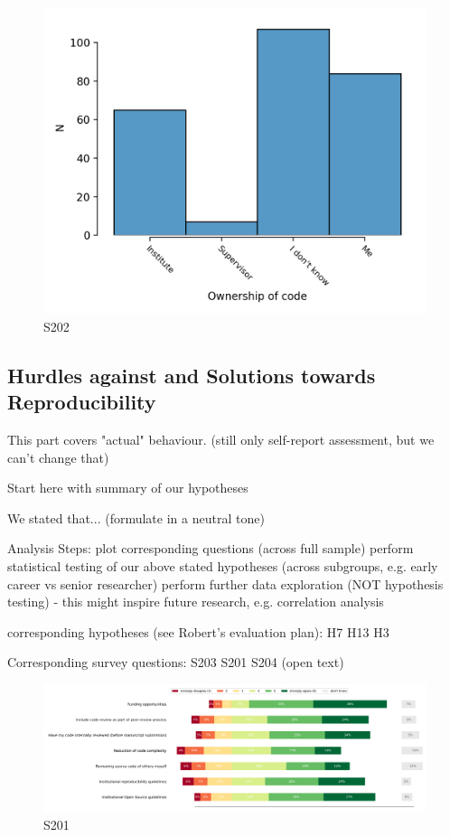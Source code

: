 \documentclass{article}
\begin{document}
\begin{figure}[h!]
    \centering
    \includegraphics[width=\textwidth]{../figs/S202.png}
	\caption{S202 }
    \label{fig:S202}
\end{figure}

\subsection{Hurdles against and Solutions towards Reproducibility}

This part covers "actual" behaviour. (still only self-report assessment, but we can't change that)

    Start here with summary of our hypotheses

We stated that... (formulate in a neutral tone)

    Analysis Steps:
        plot corresponding questions (across full sample)
        perform statistical testing of our above stated hypotheses (across subgroups, e.g. early career vs senior researcher)
        perform further data exploration (NOT hypothesis testing) - this might inspire future research, e.g. correlation analysis

    corresponding hypotheses (see Robert's evaluation plan):
        H7
        H13
        H3

    Corresponding survey questions:
        S203
        S201
        S204 (open text)

\begin{figure}[h!]
    \centering
    \includegraphics[width=\textwidth]{../figs/S201.png}
	\caption{S201 }
    \label{fig:S201}
\end{figure}
\end{document}
